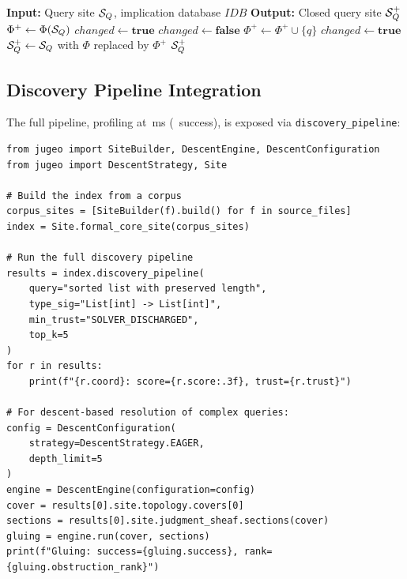 \documentclass[11pt]{article}
\newcommand{\DiscoveryPipeline}{\texttt{discovery\_pipeline}}
\newcommand{\props}{\Phi}                           %
\begin{document}
\begin{algorithm}[H]
\caption{Query Expansion via Semantic Closure}
\label{alg:query-expansion}
\begin{algorithmic}[1]
\STATE \textbf{Input:} Query site $\mathcal{S}_Q$, implication database $\mathit{IDB}$
\STATE \textbf{Output:} Closed query site $\mathcal{S}_Q^{+}$
\STATE $\props^{+} \gets \props(\Site_Q)$ 
\STATE $\mathit{changed} \gets \mathbf{true}$
  \STATE $\mathit{changed} \gets \mathbf{false}$
    \IF{$\{p_1, \ldots, p_k\} \subseteq \props^{+}$ and $q \notin \props^{+}$}
      \STATE $\props^{+} \gets \props^{+} \cup \{q\}$
      \STATE $\mathit{changed} \gets \mathbf{true}$
    \ENDIF
  \ENDFOR
\ENDWHILE
\STATE $\mathcal{S}_Q^{+} \gets \mathcal{S}_Q$ with $\props$ replaced by $\props^{+}$
\RETURN $\mathcal{S}_Q^{+}$
\end{algorithmic}
\end{algorithm}

\subsection{Discovery Pipeline Integration}
The full pipeline, profiling at \compProfDiscoveryPipelineMeanMs\,ms
(\compProfDiscoveryPipelineRate\ success), is exposed via
\DiscoveryPipeline:

\begin{lstlisting}[style=jugeo-python]
from jugeo import SiteBuilder, DescentEngine, DescentConfiguration
from jugeo import DescentStrategy, Site

# Build the index from a corpus
corpus_sites = [SiteBuilder(f).build() for f in source_files]
index = Site.formal_core_site(corpus_sites)

# Run the full discovery pipeline
results = index.discovery_pipeline(
    query="sorted list with preserved length",
    type_sig="List[int] -> List[int]",
    min_trust="SOLVER_DISCHARGED",
    top_k=5
)
for r in results:
    print(f"{r.coord}: score={r.score:.3f}, trust={r.trust}")

# For descent-based resolution of complex queries:
config = DescentConfiguration(
    strategy=DescentStrategy.EAGER,
    depth_limit=5
)
engine = DescentEngine(configuration=config)
cover = results[0].site.topology.covers[0]
sections = results[0].site.judgment_sheaf.sections(cover)
gluing = engine.run(cover, sections)
print(f"Gluing: success={gluing.success}, rank={gluing.obstruction_rank}")
\end{lstlisting}
\end{document}
